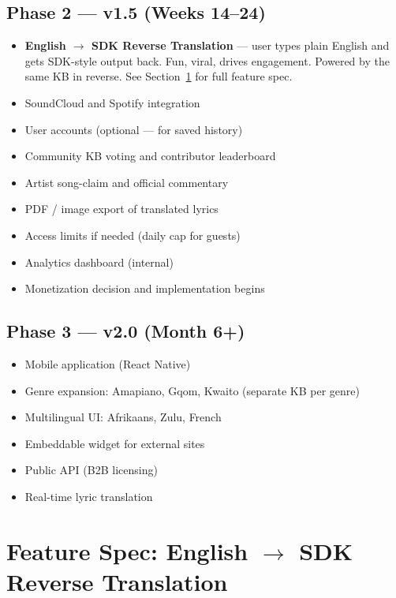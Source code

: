 \documentclass[12pt, a4paper]{article}
\begin{document}
\subsection*{Phase 2 — v1.5 (Weeks 14--24)}
\begin{itemize}
  \item \textbf{English $\to$ SDK Reverse Translation} — user types plain
        English and gets SDK-style output back. Fun, viral, drives engagement.
        Powered by the same KB in reverse. See Section~\ref{sec:reverse} for
        full feature spec.
  \item SoundCloud and Spotify integration
  \item User accounts (optional — for saved history)
  \item Community KB voting and contributor leaderboard
  \item Artist song-claim and official commentary
  \item PDF / image export of translated lyrics
  \item Access limits if needed (daily cap for guests)
  \item Analytics dashboard (internal)
  \item Monetization decision and implementation begins
\end{itemize}

\subsection*{Phase 3 — v2.0 (Month 6+)}
\begin{itemize}
  \item Mobile application (React Native)
  \item Genre expansion: Amapiano, Gqom, Kwaito (separate KB per genre)
  \item Multilingual UI: Afrikaans, Zulu, French
  \item Embeddable widget for external sites
  \item Public API (B2B licensing)
  \item Real-time lyric translation
\end{itemize}

\section{Feature Spec: English $\to$ SDK Reverse Translation}
\label{sec:reverse}
\end{document}
